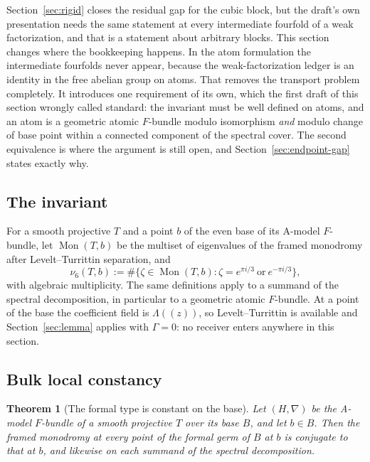 \documentclass[11pt]{article}
\newtheorem{theorem}{Theorem}
\theoremstyle{definition}
\theoremstyle{remark}
\begin{document}
Section~\ref{sec:rigid} closes the residual gap for the cubic block, but the
draft's own presentation needs the same statement at every intermediate fourfold
of a weak factorization, and that is a statement about arbitrary blocks. This
section changes where the bookkeeping happens. In the atom formulation the
intermediate fourfolds never appear, because the weak-factorization ledger is an
identity in the free abelian group on atoms. That removes the transport problem
completely. It introduces one requirement of its own, which the first draft of
this section wrongly called standard: the invariant must be well defined on
atoms, and an atom is a geometric atomic $F$-bundle modulo isomorphism
\emph{and} modulo change of base point within a connected component of the
spectral cover. The second equivalence is where the argument is still open, and
Section~\ref{sec:endpoint-gap} states exactly why.

\subsection*{The invariant}

For a smooth projective $T$ and a point $b$ of the even base of its A-model
$F$-bundle, let $\operatorname{Mon}(T,b)$ be the multiset of eigenvalues of the
framed monodromy after Levelt--Turrittin separation, and
\[
  \nu_6(T,b):=\#\bigl\{\zeta\in\operatorname{Mon}(T,b)
  :\zeta=e^{\pi i/3}\ \text{or}\ e^{-\pi i/3}\bigr\},
\]
with algebraic multiplicity. The same definitions apply to a summand of the
spectral decomposition, in particular to a geometric atomic $F$-bundle. At a
point of the base the coefficient field is $\Lambda(\!(z)\!)$, so
Levelt--Turrittin is available and Section~\ref{sec:lemma} applies with
$\Gamma=0$: no receiver enters anywhere in this section.

\subsection*{Bulk local constancy}

\begin{theorem}[The formal type is constant on the base]
\label{thm:bulk-constancy}
Let $(H,\nabla)$ be the A-model $F$-bundle of a smooth projective $T$ over its
base $B$, and let $b\in B$. Then the framed monodromy at every point of the
formal germ of $B$ at $b$ is conjugate to that at $b$, and likewise on each
summand of the spectral decomposition.
\end{theorem}
\end{document}
